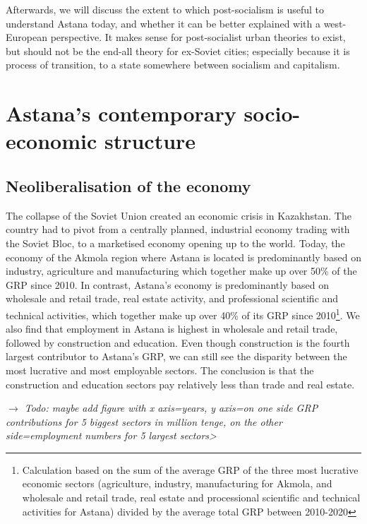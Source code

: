 \documentclass{article}
\begin{document}
Afterwards, we will discuss the extent to which post-socialism is useful to understand Astana today, and whether it can be better explained with a west-European perspective. It makes sense for post-socialist urban theories to exist, but should not be the end-all theory for ex-Soviet cities; especially because it is process of transition, to a state somewhere between socialism and capitalism.

\section{Astana's contemporary socio-economic structure}

\subsection{Neoliberalisation of the economy}

The collapse of the Soviet Union created an economic crisis in Kazakhstan. The country had to pivot from a centrally planned, industrial economy trading with the Soviet Bloc, to a marketised economy opening up to the world. Today, the economy of the Akmola region where Astana is located is predominantly based on industry, agriculture and manufacturing which together make up over 50\% of the GRP since 2010. In contrast, Astana's economy is predominantly based on wholesale and retail trade, real estate activity, and professional scientific and technical activities, which together make up over 40\% of its GRP since 2010\footnote{Calculation based on the sum of the average GRP of the three most lucrative economic sectors (agriculture, industry, manufacturing for Akmola, and wholesale and retail trade, real estate and processional scientific and technical activities for Astana) divided by the average total GRP between 2010-2020}. We also find that employment in Astana is highest in wholesale and retail trade, followed by construction and education. Even though construction is the fourth largest contributor to Astana's GRP, we can still see the disparity between the most lucrative and most employable sectors. The conclusion is that the construction and education sectors pay relatively less than trade and real estate.

\textit{$\rightarrow$ Todo: maybe add figure with x axis=years, y axis=on one side GRP contributions for 5 biggest sectors in million tenge, on the other side=employment numbers for 5 largest sectors>}
\end{document}
